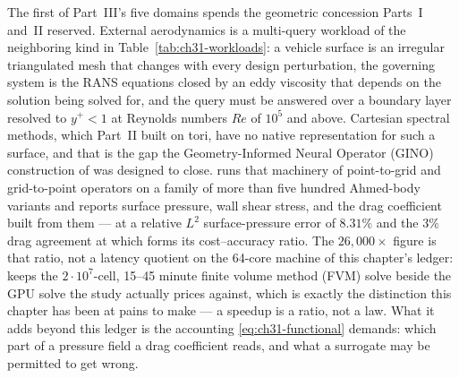 The first of Part~III's five domains spends the geometric concession Parts~I and~II reserved. External
aerodynamics is a multi-query workload of the neighboring kind in
Table~\ref{tab:ch31-workloads}: a vehicle surface is an irregular triangulated mesh that changes
with every design perturbation, the governing system is the RANS equations closed by an eddy viscosity that depends on the
solution being solved for, and the query must be answered over a boundary layer resolved to
$y^{+} < 1$ at Reynolds numbers $Re$ of $10^{5}$ and above. Cartesian
spectral methods, which Part~II built on tori, have no native representation for such a surface,
and that is the gap the Geometry-Informed Neural Operator (GINO) construction of
 was designed to
close.
 runs that machinery of point-to-grid
and grid-to-point operators on a family of more than five hundred Ahmed-body variants and reports
surface pressure, wall shear stress, and the drag coefficient built from them --- at a relative
$L^{2}$ surface-pressure error of $8.31\%$ and the $3\%$ drag agreement at which
\cite{li2023geometry} forms its cost--accuracy ratio. The $26{,}000\times$ figure is that ratio,
not a latency quotient on the 64-core machine of this chapter's ledger: 
keeps the $2 \cdot 10^{7}$-cell, 15--45 minute finite volume method (FVM) solve beside the GPU
solve the study actually prices against, which is exactly the distinction this chapter has been at
pains to make --- a speedup is a ratio, not a law. What it adds beyond this ledger is the
accounting \eqref{eq:ch31-functional} demands: which part of a pressure field a drag coefficient
reads, and what a surrogate may be permitted to get wrong.

\vspace{1.5em}
